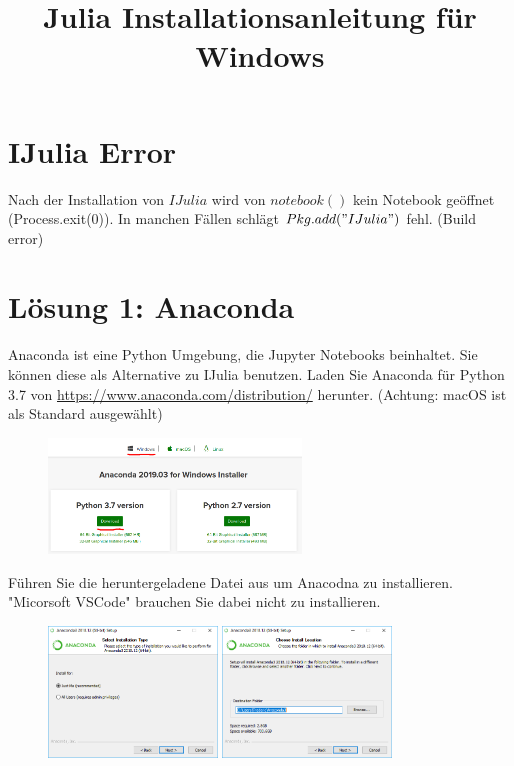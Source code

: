\documentclass[11pt, a4paper]{scrartcl}
\title{Julia Installationsanleitung für Windows}
\author{}
\date{}
\begin{document}

\section{IJulia Error}

Nach der Installation von $IJulia$ wird von $notebook()$ kein Notebook geöffnet (Process.exit(0)). In manchen Fällen schlägt $Pkg.add("IJulia")$ fehl. (Build error)


\section{Lösung 1: Anaconda}

Anaconda ist eine Python Umgebung, die Jupyter Notebooks beinhaltet. Sie können diese als Alternative zu IJulia benutzen. Laden Sie Anaconda für Python 3.7 von \url{https://www.anaconda.com/distribution/} herunter. (Achtung: macOS ist als Standard ausgewählt)

\begin{figure}[h!]
	\centering
	\includegraphics[width=0.6\textwidth]{img/download.png}
\end{figure}

Führen Sie die heruntergeladene Datei aus um Anacodna zu installieren. "Micorsoft VSCode" brauchen Sie dabei nicht zu installieren.

\begin{figure}[H]
	\centering
	\includegraphics[width=0.4\textwidth]{img/install1.png}
	\vspace{0.1\textwidth}
	\includegraphics[width=0.4\textwidth]{img/install2.png}
\end{figure}
\end{document}
